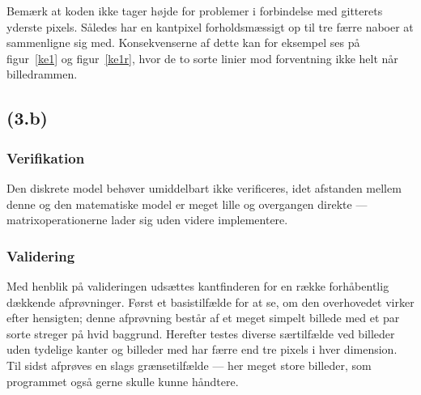 \documentclass{article}
\begin{document}
Bemærk at koden ikke tager højde for problemer i forbindelse med gitterets yderste pixels. Således har en kantpixel forholdsmæssigt op til tre færre naboer at sammenligne sig med. Konsekvenserne af dette kan for eksempel ses på figur~\ref{ke1} og figur~\ref{ke1r}, hvor de to sorte linier mod forventning ikke helt når billedrammen.

\subsection*{(3.b)}

\subsubsection*{Verifikation}

Den diskrete model behøver umiddelbart ikke verificeres, idet afstanden mellem denne og den matematiske model er meget lille og overgangen direkte --- matrixoperationerne lader sig uden videre implementere.

\subsubsection*{Validering}
Med henblik på valideringen udsættes kantfinderen for en række forhåbentlig dækkende afprøvninger. Først et basistilfælde for at se, om den overhovedet virker efter hensigten; denne afprøvning består af et meget simpelt billede med et par sorte streger på hvid baggrund. Herefter testes diverse særtilfælde ved billeder uden tydelige kanter og billeder med har færre end tre pixels i hver dimension. Til sidst afprøves en slags grænsetilfælde --- her meget store billeder, som programmet også gerne skulle kunne håndtere.
\end{document}
